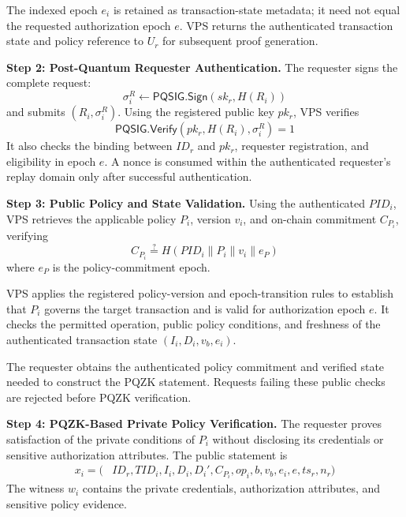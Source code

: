 \documentclass[lettersize,journal]{IEEEtran}
\begin{document}
The indexed epoch $e_i$ is retained as
transaction-state metadata; it need not equal
the requested authorization epoch $e$.
VPS returns the authenticated transaction
state and policy reference to $U_r$ for
subsequent proof generation.

\medskip
\noindent\textbf{Step 2: Post-Quantum Requester
Authentication.}
The requester signs the complete request:
\begin{equation}
\sigma_i^R\leftarrow
\mathsf{PQSIG.Sign}(sk_r,H(R_i))
\end{equation}
and submits $(R_i,\sigma_i^R)$.
Using the registered public key $pk_r$,
VPS verifies
\begin{equation}
\mathsf{PQSIG.Verify}
(pk_r,H(R_i),\sigma_i^R)=1
\end{equation}
It also checks the binding between $ID_r$
and $pk_r$, requester registration, and
eligibility in epoch $e$. A nonce is consumed
within the authenticated requester's replay
domain only after successful authentication.

\medskip
\noindent\textbf{Step 3: Public Policy and
State Validation.}
Using the authenticated $PID_i$, VPS
retrieves the applicable policy $P_i$,
version $v_i$, and on-chain commitment
$C_{P_i}$, verifying
\begin{equation}
C_{P_i}\stackrel{?}{=}
H(PID_i\parallel P_i\parallel v_i\parallel e_P)
\end{equation}
where $e_P$ is the policy-commitment epoch.

VPS applies the registered policy-version
and epoch-transition rules to establish
that $P_i$ governs the target transaction
and is valid for authorization epoch $e$.
It checks the permitted operation, public
policy conditions, and freshness of the
authenticated transaction state
$(I_i,D_i,v_b,e_i)$.

The requester obtains the authenticated
policy commitment and verified state
needed to construct the PQZK statement.
Requests failing these public checks
are rejected before PQZK verification.

\medskip
\noindent\textbf{Step 4: PQZK-Based Private
Policy Verification.}
The requester proves satisfaction of the
private conditions of $P_i$ without
disclosing its credentials or sensitive
authorization attributes. The public
statement is
\begin{equation}
\begin{aligned}
x_i=\big(&ID_r,TID_i,I_i,D_i,D_i',
C_{P_i},op_i,b,v_b,e_i,e,ts_r,n_r\big)
\end{aligned}
\end{equation}
The witness $w_i$ contains the private
credentials, authorization attributes,
and sensitive policy evidence.
\end{document}
